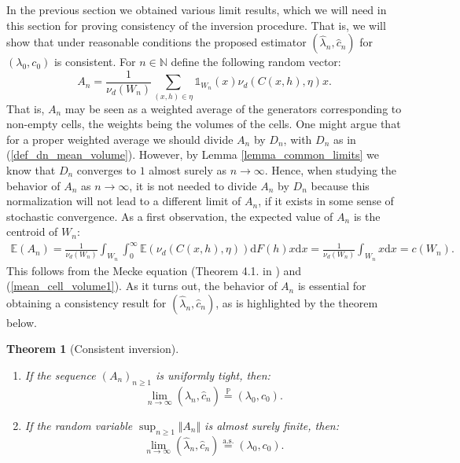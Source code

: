 \documentclass{article}
\newcommand{\NN}{\mathbb{N}}
\newcommand{\PP}{\mathbb{P}}
\newcommand{\EE}{\mathbb{E}}
\theoremstyle{plain}
\newtheorem{theorem}{Theorem}
\theoremstyle{remark}
\theoremstyle{definition}
\begin{document}
In the previous section we obtained various limit results, which we will need in this section for proving consistency of the inversion procedure. That is, we will show that under reasonable conditions the proposed estimator $(\hat{\lambda}_n,\hat{c}_n)$ for $(\lambda_0,c_0)$ is consistent. For $n \in \NN$ define the following random vector:
\begin{equation}
    A_n = \frac{1}{\nu_d(W_n)}\sum_{(x,h) \in \eta}\mathds{1}_{W_n}(x)\nu_d(C(x,h),\eta)x. \label{def_an_mean_generator}
\end{equation}
That is, $A_n$ may be seen as a weighted average of the generators corresponding to non-empty cells, the weights being the volumes of the cells. One might argue that for a proper weighted average we should divide $A_n$ by $D_n$, with $D_n$ as in (\ref{def_dn_mean_volume}). However, by Lemma \ref{lemma_common_limits} we know that $D_n$ converges to $1$ almost surely as $n \to \infty$. Hence, when studying the behavior of $A_n$ as $n \to \infty$, it is not needed to divide $A_n$ by $D_n$ because this normalization will not lead to a different limit of $A_n$, if it exists in some sense of stochastic convergence. As a first observation, the expected value of $A_n$ is the centroid of $W_n$:
\begin{align*}
    \EE\left(A_n\right) = \frac{1}{\nu_d(W_n)}\int_{W_n}\int_0^\infty \EE(\nu_d(C(x,h),\eta))\mathrm{d}F(h)x\mathrm{d}x = \frac{1}{\nu_d(W_n)}\int_{W_n}x\mathrm{d}x = c(W_n).
\end{align*}
This follows from the Mecke equation (Theorem 4.1. in \cite{Last2018}) and (\ref{mean_cell_volume1}). As it turns out, the behavior of $A_n$ is essential for obtaining a consistency result for $(\hat{\lambda}_n,\hat{c}_n)$, as is highlighted by the theorem below.

\begin{theorem}[Consistent inversion]\label{thm_consistent_inversion}\phantom{text}
\begin{enumerate}
    \item If the sequence $(A_n)_{n \geq 1}$ is uniformly tight, then:
    \[\lim_{n \to \infty} \left(\hat{\lambda}_n,\hat{c}_n\right) \overset{\PP}{=} (\lambda_0,c_0).\]
    \item If the random variable $\sup_{n \geq 1}\Vert A_n \Vert$ is almost surely finite, then:
    \[\lim_{n \to \infty}\left(\hat{\lambda}_n,\hat{c}_n\right) \overset{\text{a.s.}}{=} (\lambda_0,c_0).\]
\end{enumerate}
\end{theorem}
\end{document}
